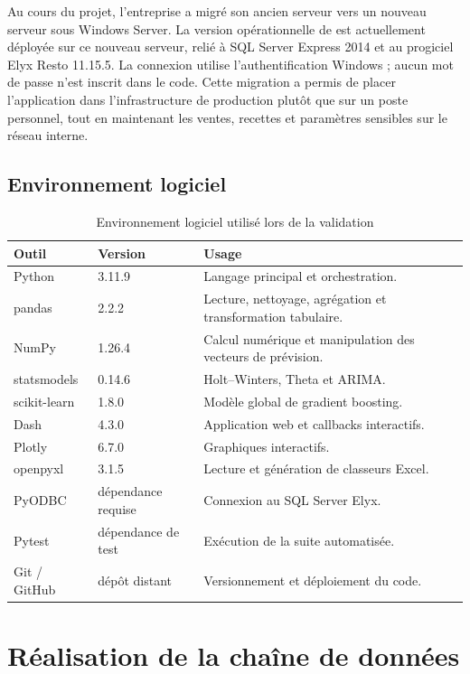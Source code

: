 Au cours du projet, l'entreprise a migré son ancien serveur vers un nouveau
serveur sous Windows Server. La version opérationnelle de \NomProjet{} est
actuellement déployée sur ce nouveau serveur, relié à SQL Server Express 2014 et
au progiciel Elyx Resto 11.15.5. La connexion utilise l'authentification Windows ;
aucun mot de passe n'est inscrit dans le code. Cette migration a permis de placer
l'application dans l'infrastructure de production plutôt que sur un poste
personnel, tout en maintenant les ventes, recettes et paramètres sensibles sur le
réseau interne.

\subsection{Environnement logiciel}

\begin{table}[H]
\centering
\caption{Environnement logiciel utilisé lors de la validation}
\label{tab:env-logiciel}
\begin{tabularx}{\textwidth}{p{3.4cm}p{2.4cm}Y}
\toprule
\textbf{Outil} & \textbf{Version} & \textbf{Usage} \\
\midrule
Python & 3.11.9 & Langage principal et orchestration. \\
pandas & 2.2.2 & Lecture, nettoyage, agrégation et transformation tabulaire. \\
NumPy & 1.26.4 & Calcul numérique et manipulation des vecteurs de prévision. \\
statsmodels & 0.14.6 & Holt--Winters, Theta et ARIMA. \\
scikit-learn & 1.8.0 & Modèle global de gradient boosting. \\
Dash & 4.3.0 & Application web et callbacks interactifs. \\
Plotly & 6.7.0 & Graphiques interactifs. \\
openpyxl & 3.1.5 & Lecture et génération de classeurs Excel. \\
PyODBC & dépendance requise & Connexion au SQL Server Elyx. \\
Pytest & dépendance de test & Exécution de la suite automatisée. \\
Git / GitHub & dépôt distant & Versionnement et déploiement du code. \\
\bottomrule
\end{tabularx}
\end{table}

\section{Réalisation de la chaîne de données}

